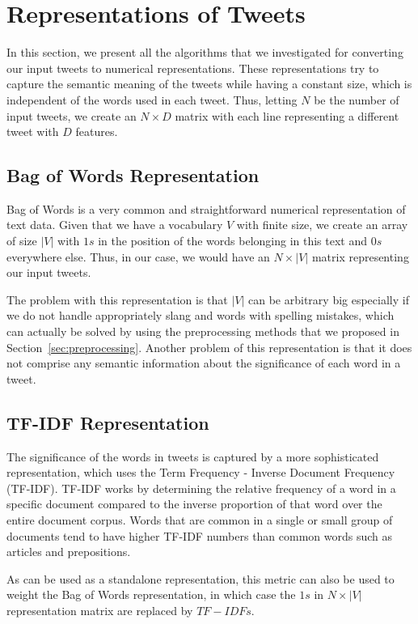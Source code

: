 \section{Representations of Tweets}
\label{sec:tweetRepresentations}

In this section, we present all the algorithms that we investigated for converting our input tweets to numerical representations.
These representations try to capture the semantic meaning of the tweets 
while having a constant size, which is independent of the words used in each tweet.
Thus, letting $N$ be the number of input tweets, we create an $N \times D$ matrix
with each line representing a different tweet with $D$ features.


\subsection{Bag of Words Representation}
Bag of Words \cite{harris1954distributional} is a very common and straightforward numerical representation of text data.
Given that we have a vocabulary $V$ with finite size, we create
an array of size $|V|$ with $1s$ in the position of the words belonging in this text and $0s$ everywhere else.
Thus, in our case, we would have an $N \times |V|$ matrix representing our input tweets.

The problem with this representation is that $|V|$ can be arbitrary big especially if we do not handle appropriately slang and words with spelling mistakes, which can actually be solved by using the preprocessing methods that we proposed in Section~\ref{sec:preprocessing}. 
Another problem of this representation is that it does not comprise any semantic information about the significance of each word in a tweet. 


\subsection{TF-IDF Representation}
The significance of the words in tweets is captured by a more sophisticated representation, which uses the Term Frequency - Inverse Document Frequency (TF-IDF).
TF-IDF \cite{sparck1972statistical} works by determining the relative frequency of a word in a specific document compared to the inverse proportion of that word over the entire document corpus.
Words that are common in a single or small group of documents tend to have higher TF-IDF numbers than common words such as articles and prepositions. 

As can be used as a standalone representation, this metric can also be used to weight the Bag of Words representation, in which case the $1s$ in $N \times |V|$  representation matrix are replaced by $TF-IDFs$.


